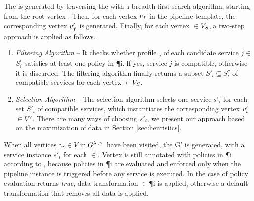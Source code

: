 The \pipelineInstance  is generated by traversing the \pipelineTemplate with a breadth-first search algorithm, starting from the root vertex .
Then, for each vertex $v_{f}$ in the pipeline template, the corresponding vertex $v'_{f}$ is generated.
Finally, for each vertex $\in$$V_S$, a two-step approach is applied as follows.

\begin{enumerate}
  \item \textit{Filtering Algorithm} -- It checks whether profile \profile$_j$ of each candidate service $\si{j}$$\in$$S^c_{i}$ satisfies at least one policy in \P{i}. If yes, service $\si{j}$ is compatible, otherwise it is discarded. The filtering algorithm finally returns a subset $S'_{i}$$\subseteq$$S^c_{i}$ of compatible services for each vertex $\in$$V_S$.
  \item \textit{Selection Algorithm} -- The selection algorithm selects one service $s'_i$ for each set $S'_{i}$ of compatible services, which instantiates the corresponding vertex $v'_{i}$$\in$$V'$. There are many ways of choosing $s'_i$, we present our approach based on the maximization of data \quality \emph{\q} in Section \ref{sec:heuristics}.
\end{enumerate}

When all vertices $v_{i}$$\in$$V$ in $G^{\lambda\,,\gamma\,}$ have been visited, the \pipelineInstance G' is generated, with a service instance $s'_i$ for each $\in$\Vp. Vertex  is still annotated with policies in \P{i} according to \myLambda, because policies in \P{i} are evaluated and enforced only when the pipeline instance is triggered before any service is executed. In the case of policy evaluation returns \emph{true}, data transformation \TP$\in$\P{i} is applied, otherwise a default transformation that removes all data is applied.

